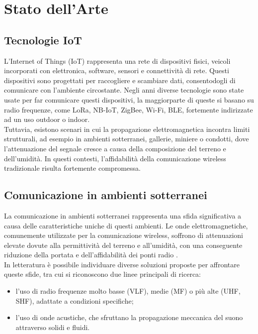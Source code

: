 \chapter{Stato dell'Arte}
\label{chap:stato_arte}

\section{Tecnologie IoT}
L'Internet of Things (IoT) rappresenta una rete di dispositivi fisici, veicoli incorporati con elettronica, software, sensori e connettività di rete.
Questi dispositivi sono progettati per raccogliere e scambiare dati, consentodogli di comunicare con l'ambiente circostante.
Negli anni diverse tecnologie sono state usate per far comunicare questi dispositivi, la maggiorparte di queste si basano su radio frequenze, 
come LoRa, NB-IoT, ZigBee, Wi-Fi, BLE, fortemente indirizzate ad un uso outdoor o indoor. \\

Tuttavia, esistono scenari in cui la propagazione elettromagnetica incontra limiti
strutturali, ad esempio in ambienti sotterranei, gallerie, miniere o condotti, dove
l'attenuazione del segnale cresce a causa della composizione del terreno e
dell'umidità. In questi contesti, l'affidabilità della comunicazione wireless
tradizionale risulta fortemente compromessa.

\section{Comunicazione in ambienti sotterranei}
La comunicazione in ambienti sotterranei rappresenta una sfida significativa a causa delle caratteristiche uniche di questi ambienti.
Le onde elettromagnetiche, comunemente utilizzate per la comunicazione wireless, soffrono di attenuazioni elevate dovute alla permittività
del terreno e all'umidità, con una conseguente riduzione della portata e dell'affidabilità dei ponti radio \citep[sec.~2]{akyildiz2006}.\\
In letteratura è possibile individuare diverse soluzioni proposte per affrontare queste sfide, tra cui si riconoscono due linee principali di ricerca:
\begin{itemize}
    \item l'uso di radio frequenze molto basse (VLF), medie (MF)
          o più alte (UHF, SHF), adattate a condizioni specifiche;
    \item l'uso di onde acustiche, che sfruttano la propagazione meccanica del suono
          attraverso solidi e fluidi.
\end{itemize}
